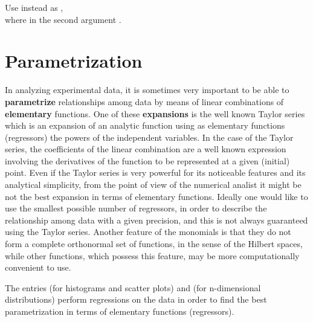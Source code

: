  
Use  instead as 
,\\
where  in the second argument .
\medskip
{}
 

\section{Parametrization}
\label{HPARAMET}
 
In analyzing experimental data, it is sometimes very important
to be able
to {\bf parametrize} relationships among data by means of linear
combinations of {\bf elementary} functions. One of these
{\bf expansions} is the well known Taylor series which is an expansion
of an analytic function using as elementary functions (regressors) the
powers of the independent variables.
In the case of the Taylor series, the coefficients of
the linear combination are a well known expression involving the derivatives
of the function to be represented at a given (initial) point.
Even if the Taylor
series is very powerful for its noticeable features and its analytical
simplicity, from the point of view of the numerical analist it might
be not the best expansion in terms of elementary functions.
Ideally one would like to use
the smallest possible number of regressors, in order to describe the
relationship among data with a given precision, and this is not always
guaranteed using the Taylor series.
Another feature of the monomials is that
they do not form a complete orthonormal set of functions, in the sense
of the Hilbert spaces, while other functions, which possess this feature,
may be more computationally convenient to use.
 
The entries  (for histograms and scatter plots) and
 (for n-dimensional distributions) perform regressions on the
data in order to find the best parametrization in terms of elementary functions
(regressors).
 
